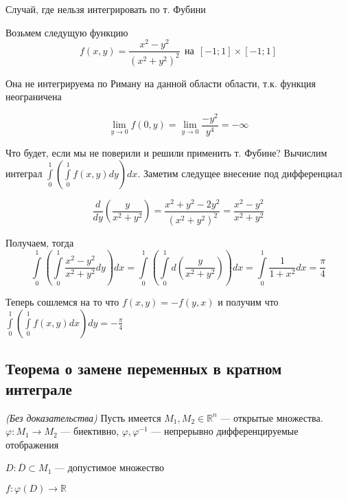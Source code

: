 \begin{center}
    
\end{center}


\ex Случай, где нельзя интегрировать по т. Фубини

Возьмем следущую функцию
\begin{equation}
f(x, y) = \frac{x^2 - y^2}{(x^2 + y^2)^2} \ \ \text{на} \ \ [-1;1] \times [-1;1]
\end{equation}

Она не интегрируема по Риману на данной области области, т.к. функция неограничена

\begin{equation}
\lim_{y \to 0} f(0, y) = \lim_{y \to 0} \frac{-y^2}{y^4} = -\infty
\end{equation}

Что будет, если мы не поверили и решили применить т. Фубине? Вычислим интеграл $\int\limits_0^1 \left( \int\limits_0^1 f(x, y) dy \right) dx$. Заметим следущее внесение под дифференциал

\begin{equation}
\frac{d}{dy} \left( \frac{y}{x^2 + y^2} \right) = \frac{x^2 + y^2 - 2y^2}{(x^2 + y^2)^2} = \frac{x^2 - y^2}{x^2 + y^2}
\end{equation}

Получаем, тогда
\begin{equation}
  \int\limits_0^1 \left( \int\limits_0^1 \frac{x^2 - y^2}{x^2 + y^2} dy \right) dx =
  \int\limits_0^1 \left( \int\limits_0^1 d\left({\frac{y}{x^2 + y^2}}\right) \right) dx =
  \int\limits_0^1 \frac{1}{1+x^2} dx = \frac{\pi}{4}
\end{equation}

Теперь сошлемся на то что $f(x, y) = -f(y, x)$ и получим что $\int\limits_0^1 \left( \int\limits_0^1 f(x, y) dx \right) dy = -\frac{\pi}{4}$




\subsection{Теорема о замене переменных в кратном интеграле}
\theorem\textit{(Без доказательства)}
Пусть имеется $M_1,M_2\in\mathbb{R}^n$ — открытые множества. $\varphi:M_1\longrightarrow M_2$ — биективно, $\varphi,\varphi^{-1}$ — непрерывно дифференцируемые отображения

$D:\overline{D}\subset M_1$ — допустимое множество

$f:\varphi(D)\longrightarrow\mathbb{R}$

